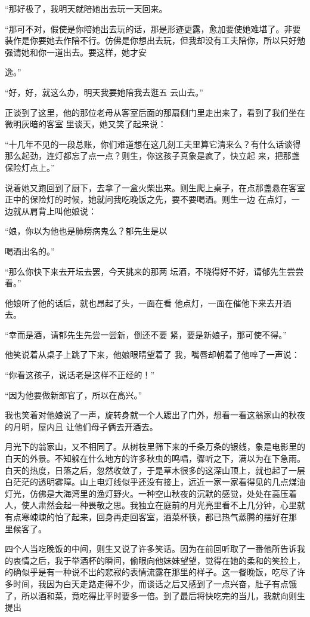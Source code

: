 \documentclass{article}
\begin{document}
“那好极了，我明天就陪她出去玩一天回来。

“那可不对，假使是你陪她出去玩的话，那是形迹更露，愈加要使她难堪了。非要装作是你要她去作陪不行。仿佛是你想出去玩，但我却没有工夫陪你，所以只好勉强请她和你一道出去。要这样，她才安
\newpage

逸。” 

“好，好，就这么办，明天我要她陪我去逛五
云山去。” 

正谈到了这里，他的那位老母从客室后面的那扇侧门里走出来了，看到了我们坐在微明灰暗的客室
里谈天，她又笑了起来说： 

“十几年不见的一段总账，你们难道想在这几刻工夫里算它清来么？有什么话谈得那么起劲，连灯都忘了点一点？则生，你这孩子真象是疯了，快立起
来，把那盏保险灯点上。” 

说着她又跑回到了厨下，去拿了一盒火柴出来。则生爬上桌子，在点那盏悬在客室正中的保险灯的时候，她就问我吃晚饭之先，要不要喝酒。则生一边
在点灯，一边就从肩背上叫他娘说： 

“娘，你以为他也是肺痨病鬼么？郁先生是以

\newpage
喝酒出名的。” 

“那么你快下来去开坛去罢，今天挑来的那两
坛酒，不晓得好不好，请郁先生尝尝看。” 

他娘听了他的话后，就也昂起了头，一面在看
他点灯，一面在催他下来去开酒去。 

“幸而是酒，请郁先生先尝一尝新，倒还不要
紧，要是新娘子，那可使不得。” 

他笑说着从桌子上跳了下来，他娘眼睛望着了
我，嘴唇却朝着了他啐了一声说： 


“你看这孩子，说话老是这样不正经的！” 


“因为他要做新郎官了，所以在高兴。” 

我也笑着对他娘说了一声，旋转身就一个人踱出了门外，想看一看这翁家山的秋夜的月明，屋内且
让他们母子俩去开酒去。 

\newpage

月光下的翁家山，又不相同了。从树枝里筛下来的千条万条的银线，象是电影里的白天的外景。不知躲在什么地方的许多秋虫的鸣唱，骤听之下，满以为在下急雨。白天的热度，日落之后，忽然收敛了，于是草木很多的这深山顶上，就也起了一层白茫茫的透明雾障。山上电灯线似乎还没有接上，远近一家一家看得见的几点煤油灯光，仿佛是大海湾里的渔灯野火。一种空山秋夜的沉默的感觉，处处在高压着人，使人肃然会起一种畏敬之思。我独立在庭前的月光亮里看不上几分钟，心里就有点寒竦竦的怕了起来，回身再走回客室，酒菜杯筷，都已热气蒸腾的摆好在那
里候客了。 

四个人当吃晚饭的中间，则生又说了许多笑话。因为在前回听取了一番他所告诉我的衷情之后，我于举酒杯的瞬间，偷眼向他妹妹望望，觉得在她的柔和的笑脸上，的确似乎是有一种说不出的悲寂的表情流露在那里的样子。这一餐晚饭，吃尽了许多时间，我因为白天走路走得不少，而谈话之后又感到了一点兴奋，肚子有点饿了，所以酒和菜，竟吃得比平时要多一倍。到了最后将快吃完的当儿，我就向则生提出
\newpage
\end{document}
